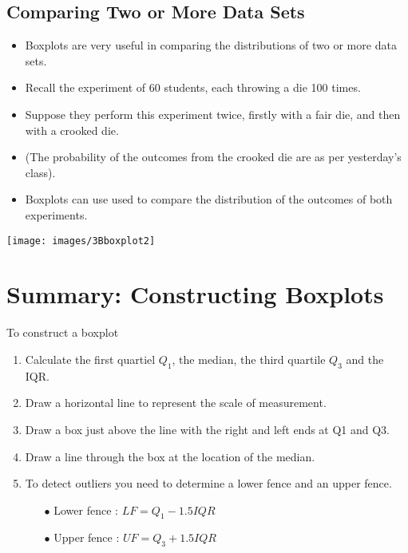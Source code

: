 \documentclass[a4paper,12pt]{article}
\begin{document}
{\subsection*{Comparing Two or More Data Sets}
\begin{itemize}
\item Boxplots are very useful in comparing the distributions of two or more data sets.
\item Recall the experiment of 60 students, each throwing a die 100 times.
\item Suppose they perform this experiment twice, firstly with a fair die, and then with a crooked die.
\item (The probability of the outcomes from the crooked die are as per yesterday's class).
\item Boxplots can use used to compare the distribution of the outcomes of both experiments.
\end{itemize}

\newpage

\begin{center}
\texttt{[image: images/3Bboxplot2]}
\end{center}
\section*{Summary: Constructing Boxplots}
To construct a boxplot

\begin{enumerate}
\item Calculate the first quartiel $Q_1$, the median, the third quartile $Q_3$ and the IQR.

\item Draw a horizontal line to represent the scale of measurement.

\item Draw a box just above  the line with the right and left ends at Q1 and Q3.

\item Draw a line through the box at the location of the median.


\item To detect outliers you need to determine a lower fence and an upper fence.
\begin{itemize}
\item[$\bullet$] Lower fence : $LF = Q_1 - 1.5 IQR$ 
\item[$\bullet$] Upper fence : $UF = Q_3 + 1.5 IQR$ 
\end{itemize}


\end{enumerate}}
\end{document}
